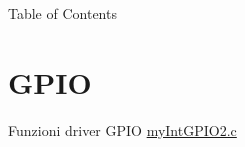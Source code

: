 \begin{DoxyParagraph}{Table of Contents}

\end{DoxyParagraph}
\hypertarget{index_GPIO}{}\section{G\+P\+IO}\label{index_GPIO}

\begin{DoxyItemize}
\item Funzioni driver G\+P\+IO \hyperlink{myIntGPIO2_8c}{my\+Int\+G\+P\+I\+O2.\+c} 
\end{DoxyItemize}